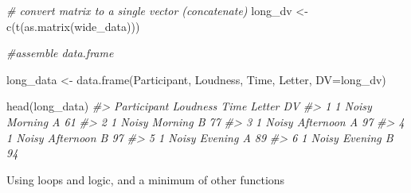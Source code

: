 \documentclass[
]{book}
\newenvironment{Shaded}{\begin{snugshade}}{\end{snugshade}}
\newcommand{\AttributeTok}[1]{\textcolor[rgb]{0.77,0.63,0.00}{#1}}
\newcommand{\CommentTok}[1]{\textcolor[rgb]{0.56,0.35,0.01}{\textit{#1}}}
\newcommand{\FunctionTok}[1]{\textcolor[rgb]{0.00,0.00,0.00}{#1}}
\newcommand{\NormalTok}[1]{#1}
\newcommand{\OtherTok}[1]{\textcolor[rgb]{0.56,0.35,0.01}{#1}}
\theoremstyle{definition}
\theoremstyle{definition}
\theoremstyle{definition}
\theoremstyle{definition}
\theoremstyle{remark}
\begin{document}
\begin{Shaded}
\begin{Highlighting}[]
\CommentTok{\# convert matrix to a single vector (concatenate)}
\NormalTok{long\_dv }\OtherTok{\textless{}{-}} \FunctionTok{c}\NormalTok{(}\FunctionTok{t}\NormalTok{(}\FunctionTok{as.matrix}\NormalTok{(wide\_data)))}

\CommentTok{\#assemble data.frame}

\NormalTok{long\_data }\OtherTok{\textless{}{-}} \FunctionTok{data.frame}\NormalTok{(Participant,}
\NormalTok{                        Loudness,}
\NormalTok{                        Time, }
\NormalTok{                        Letter,}
                        \AttributeTok{DV=}\NormalTok{long\_dv)}

\FunctionTok{head}\NormalTok{(long\_data)}
\CommentTok{\#\textgreater{}   Participant Loudness      Time Letter DV}
\CommentTok{\#\textgreater{} 1           1    Noisy   Morning      A 61}
\CommentTok{\#\textgreater{} 2           1    Noisy   Morning      B 77}
\CommentTok{\#\textgreater{} 3           1    Noisy Afternoon      A 97}
\CommentTok{\#\textgreater{} 4           1    Noisy Afternoon      B 97}
\CommentTok{\#\textgreater{} 5           1    Noisy   Evening      A 89}
\CommentTok{\#\textgreater{} 6           1    Noisy   Evening      B 94}
\end{Highlighting}
\end{Shaded}

Using loops and logic, and a minimum of other functions
\end{document}
